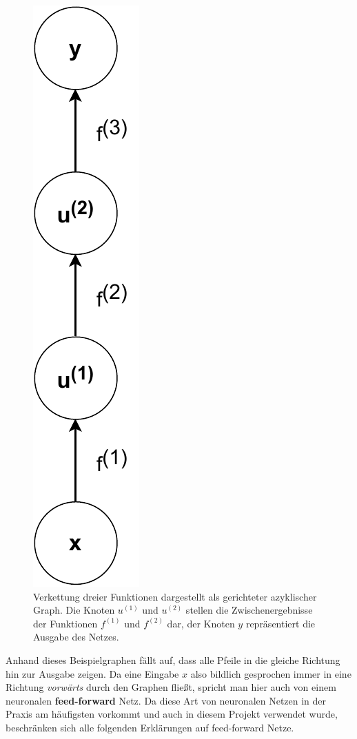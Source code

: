 \begin{figure}
    \centering
    \includegraphics[height=0.3\textheight]{abbildungen/basic_network_graph}
    \caption{Verkettung dreier Funktionen dargestellt als
        gerichteter azyklischer Graph. Die Knoten $u^{(1)}$ und
        $u^{(2)}$ stellen die Zwischenergebnisse der Funktionen
        $f^{(1)}$ und $f^{(2)}$ dar, der Knoten $y$ repr\"asentiert
        die Ausgabe des Netzes.}
    \label{fig:einfacher-graph}
\end{figure}

Anhand dieses Beispielgraphen f\"allt auf, dass alle Pfeile in die
gleiche Richtung hin zur Ausgabe zeigen. Da eine Eingabe $x$ also
bildlich gesprochen immer in eine Richtung \textit{vorw\"arts} durch
den Graphen flie{\ss}t, spricht man hier auch von einem neuronalen
\textbf{feed-forward} Netz. Da diese Art von neuronalen Netzen in der
Praxis am h\"aufigsten vorkommt und auch in diesem Projekt verwendet
wurde, beschr\"anken sich alle folgenden Erkl\"arungen auf
feed-forward Netze.

